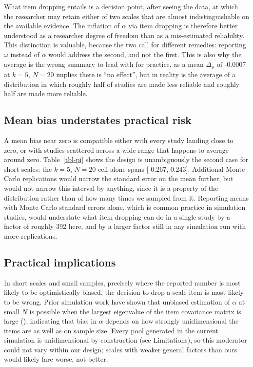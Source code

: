 \documentclass[
  nonatbib,
  authoryear,
  preprint]{elsarticle}
\begin{document}
What item dropping entails is a decision point, after seeing the data,
at which the researcher may retain either of two scales that are almost
indistinguishable on the available evidence. The inflation of \(\alpha\)
via item dropping is therefore better understood as a researcher degree
of freedom than as a mis-estimated reliability. This distinction is
valuable, because the two call for different remedies: reporting
\(\omega\) instead of \(\alpha\) would address the second, and not the
first. This is also why the average is the wrong summary to lead with
for practice, as a mean \(\Delta_\rho\) of -0.0007 at \(k = 5\),
\(N = 20\) implies there is ``no effect'', but in reality is the average
of a distribution in which roughly half of studies are made less
reliable and roughly half are made more reliable.

\subsection{Mean bias understates practical
risk}\label{mean-bias-understates-practical-risk}

A mean bias near zero is compatible either with every study landing
close to zero, or with studies scattered across a wide range that
happens to average around zero. Table~\ref{tbl-pi} shows the design is
unambiguously the second case for short scales: the \(k = 5\),
\(N = 20\) cell alone spans {[}-0.267, 0.243{]}. Additional Monte Carlo
replications would narrow the standard error on the mean further, but
would not narrow this interval by anything, since it is a property of
the distribution rather than of how many times we sampled from it.
Reporting means with Monte Carlo standard errors alone, which is common
practice in simulation studies, would understate what item dropping can
do in a single study by a factor of roughly 392 here, and by a larger
factor still in any simulation run with more replications.

\subsection{Practical implications}\label{practical-implications}

In short scales and small samples, precisely where the reported number
is most likely to be optimistically biased, the decision to drop a scale
item is most likely to be wrong. Prior simulation work have shown that
unbiased estimation of \(\alpha\) at small \(N\) is possible when the
largest eigenvalue of the item covariance matrix is large
(), indicating that
bias in \(\alpha\) depends on how strongly unidimensional the items are
as well as on sample size. Every pool generated in the current
simulation is unidimensional by construction (see Limitations), so this
moderator could not vary within our design; scales with weaker general
factors than ours would likely fare worse, not better.
\end{document}
